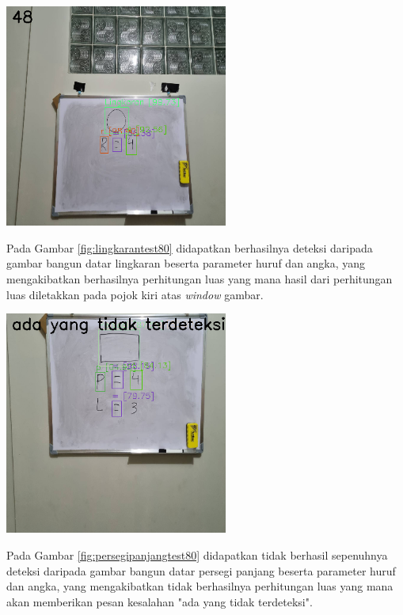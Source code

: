 \begin{center}
	\includegraphics[width=0.55\textwidth]{gambar/ling80hasil.png}
	\label{fig:lingkarantest80}
\end{center}
Pada Gambar \ref{fig:lingkarantest80} didapatkan berhasilnya deteksi daripada gambar bangun datar lingkaran beserta parameter huruf dan angka, yang mengakibatkan berhasilnya perhitungan luas yang mana hasil dari perhitungan luas diletakkan pada pojok kiri atas \textit{window} gambar.

\begin{center}
	\includegraphics[width=0.55\textwidth]{gambar/pp80hasil.png}
	\label{fig:persegipanjangtest80}
\end{center}
Pada Gambar \ref{fig:persegipanjangtest80} didapatkan tidak berhasil sepenuhnya deteksi daripada gambar bangun datar persegi panjang beserta parameter huruf dan angka, yang mengakibatkan tidak berhasilnya perhitungan luas yang mana akan memberikan pesan kesalahan "ada yang tidak terdeteksi".

